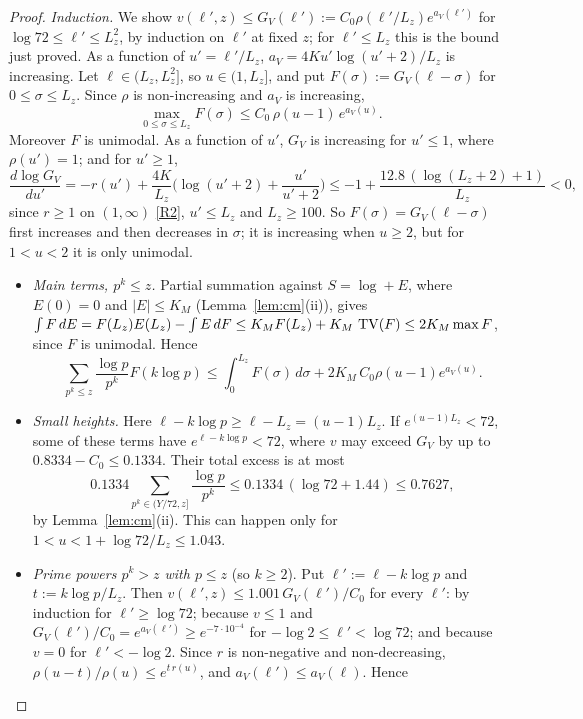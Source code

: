 \begin{proof}
\emph{Induction.} We show $v(\ell',z)\le G_V(\ell'):=C_0\rho(\ell'/L_z)e^{a_V(\ell')}$ for $\log72\le\ell'\le L_z^2$, by
induction on $\ell'$ at fixed $z$; for $\ell'\le L_z$ this is the bound just proved. As a function of $u'=\ell'/L_z$,
$a_V=4Ku'\log(u'+2)/L_z$ is increasing. Let $\ell\in(L_z,L_z^2]$, so $u\in(1,L_z]$, and put $F(\sigma):=G_V(\ell-\sigma)$ for
$0\le\sigma\le L_z$. Since $\rho$ is non-increasing and $a_V$ is increasing,
\begin{equation}\label{eq:lemV-maxF}
  \max_{0\le\sigma\le L_z}F(\sigma)\le C_0\,\rho(u-1)\,e^{a_V(u)} .
\end{equation}
Moreover $F$ is unimodal. As a function of $u'$, $G_V$ is increasing for $u'\le1$, where $\rho(u')=1$; and for $u'\ge1$,
\[
  \frac{d\log G_V}{du'}=-r(u')+\frac{4K}{L_z}\Big(\log(u'+2)+\frac{u'}{u'+2}\Big)\le-1+\frac{12.8\,(\log(L_z+2)+1)}{L_z}<0,
\]
since $r\ge1$ on $(1,\infty)$ \ref{R2}, $u'\le L_z$ and $L_z\ge100$. So $F(\sigma)=G_V(\ell-\sigma)$ first increases and then
decreases in $\sigma$; it is increasing when $u\ge2$, but for $1<u<2$ it is only unimodal.
\begin{itemize}
\item \emph{Main terms, $p^k\le z$.} Partial summation against $S=\log+E$, where $E(0)=0$ and $|E|\le K_M$
  (Lemma~\ref{lem:cm}(ii)), gives $\int F\,dE=F(L_z)E(L_z)-\int E\,dF\le K_MF(L_z)+K_M\,\operatorname{TV}(F)\le2K_M\max F$, since $F$ is
  unimodal. Hence
  \[
    \sum_{p^k\le z}\frac{\log p}{p^k}F(k\log p)\le\int_0^{L_z}F(\sigma)\,d\sigma+2K_M\,C_0\rho(u-1)e^{a_V(u)} .
  \]
\item \emph{Small heights.} Here $\ell-k\log p\ge\ell-L_z=(u-1)L_z$. If $e^{(u-1)L_z}<72$, some of these terms have
  $e^{\ell-k\log p}<72$, where $v$ may exceed $G_V$ by up to $0.8334-C_0\le0.1334$. Their total excess is at most
  \[
    0.1334\sum_{p^k\in(Y/72,z]}\frac{\log p}{p^k}\le0.1334\,(\log72+1.44)\le0.7627,
  \]
  by Lemma~\ref{lem:cm}(ii). This can happen only for $1<u<1+\log72/L_z\le1.043$.
\item \emph{Prime powers $p^k>z$ with $p\le z$} (so $k\ge2$). Put $\ell':=\ell-k\log p$ and $t:=k\log p/L_z$. Then
  $v(\ell',z)\le1.001\,G_V(\ell')/C_0$ for every $\ell'$: by induction for $\ell'\ge\log72$; because $v\le1$ and
  $G_V(\ell')/C_0=e^{a_V(\ell')}\ge e^{-7\cdot10^{-4}}$ for $-\log2\le\ell'<\log72$; and because $v=0$ for $\ell'<-\log2$.
  Since $r$ is non-negative and non-decreasing, $\rho(u-t)/\rho(u)\le e^{t\,r(u)}$, and $a_V(\ell')\le a_V(\ell)$. Hence

\end{itemize}
\end{proof}
